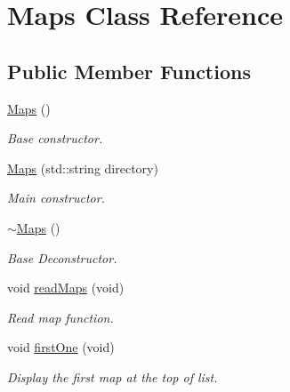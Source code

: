 \hypertarget{class_maps}{\section{Maps Class Reference}
\label{class_maps}
}
\subsection*{Public Member Functions}
\begin{DoxyCompactItemize}
\item 
\hyperlink{class_maps_a87e73431397d1c36dcc2a95ef2b00732}{Maps} ()
\begin{DoxyCompactList}\small\item\em Base constructor. \end{DoxyCompactList}\item 
\hyperlink{class_maps_a9433b5dfd9a51fce5d2b950e97dacfbd}{Maps} (std\-::string directory)
\begin{DoxyCompactList}\small\item\em Main constructor. \end{DoxyCompactList}\item 
\hypertarget{class_maps_aa3fbced631bfb5f4d1fe541a8a29384f}{\hyperlink{class_maps_aa3fbced631bfb5f4d1fe541a8a29384f}{$\sim$\-Maps} ()}\label{class_maps_aa3fbced631bfb5f4d1fe541a8a29384f}

\begin{DoxyCompactList}\small\item\em Base Deconstructor. \end{DoxyCompactList}\item 
void \hyperlink{class_maps_a65ebe26294d69e741ee94d5530597886}{read\-Maps} (void)
\begin{DoxyCompactList}\small\item\em Read map function. \end{DoxyCompactList}\item 
\hypertarget{class_maps_acc65a2a83bdad1c467531b3e25188b91}{void \hyperlink{class_maps_acc65a2a83bdad1c467531b3e25188b91}{first\-One} (void)}\label{class_maps_acc65a2a83bdad1c467531b3e25188b91}

\begin{DoxyCompactList}\small\item\em Display the first map at the top of list. \end{DoxyCompactList}\end{DoxyCompactItemize}


